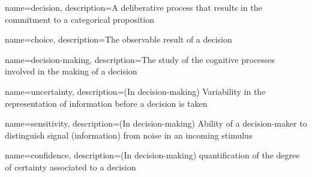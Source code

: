 {
    name=decision,
    description={A deliberative process that results in the commitment to a categorical proposition \cite{goldNeuralBasisDecision2007}}
}

{
    name=choice,
    description={The observable result of a decision}
}

{
    name=decision-making,
    description={The study of the cognitive processes involved in the making of a decision}
}

{
    name=uncertainty,
    description={(In decision-making) Variability in the representation of information before a decision is taken \cite{mamassianConfidenceForcedChoiceOther2020}}
}

{
    name=sensitivity,
    description={(In decision-making) Ability of a decision-maker to distinguish signal (information) from noise in an incoming stimulus}
}

{
    name=confidence,
    description={(In decision-making) quantification of the degree of certainty associated to a decision \cite{meynielConfidenceBayesianProbability2015}}
}
